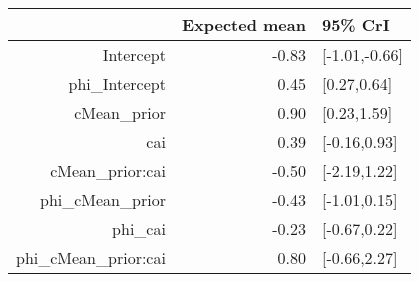 \begin{tabular}{rrl}
  \hline
 & Expected mean & 95\% CrI \\ 
  \hline
Intercept & -0.83 & [-1.01,-0.66] \\ 
  phi\_Intercept & 0.45 & [0.27,0.64] \\ 
  cMean\_prior & 0.90 & [0.23,1.59] \\ 
  cai & 0.39 & [-0.16,0.93] \\ 
  cMean\_prior:cai & -0.50 & [-2.19,1.22] \\ 
  phi\_cMean\_prior & -0.43 & [-1.01,0.15] \\ 
  phi\_cai & -0.23 & [-0.67,0.22] \\ 
  phi\_cMean\_prior:cai & 0.80 & [-0.66,2.27] \\ 
   \hline
\end{tabular}

